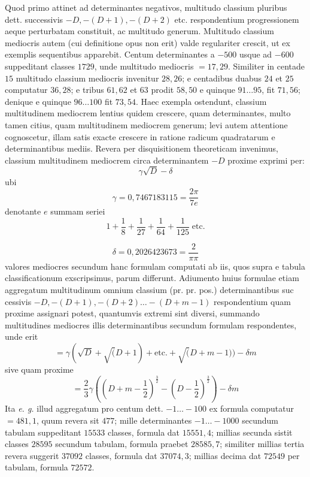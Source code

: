 Quod primo attinet ad determinantes negativos, multitudo classium pluribus dett. successivis \(-D,-(D+1),-(D+2)\) etc. respondentium progressionem aeque perturbatam constituit, ac multitudo generum. Multitudo classium mediocris autem (cui definitione opus non erit) valde regulariter crescit, ut ex exemplis sequentibus apparebit. Centum determinantes a \(-500\) usque ad \(-600\) suppeditant classes \(1729\), unde multitudo mediocris \(=17{,}29\). Similiter in centade \(15\) multitudo classium mediocris invenitur \(28{,}26\); e centadibus duabus \(24\) et \(25\) computatur \(36{,}28\); e tribus \(61,62\) et \(63\) prodit \(58{,}50\) e quinque \(91\ldots95\), fit \(71{,}56\); denique e quinque \(96\ldots100\) fit \(73{,}54\). Haec exempla ostendunt, classium multitudinem mediocrem lentius quidem crescere, quam determinantes, multo tamen citius, quam multitudinem mediocrem generum; levi autem attentione cognoscetur, illam satis exacte crescere in ratione radicum quadratarum e determinantibus mediis. Revera per disquisitionem theoreticam invenimus, classium multitudinem mediocrem circa determinantem \(-D\) proxime exprimi per: 
\[\gamma\surd D-\delta\]
 ubi 
\[\gamma=0{,}7467183115=\frac{2\pi}{7e}\]
 denotante \(e\) summam seriei 
\[1+\frac18+\frac1{27}+\frac1{64}+\frac1{125}\;\text{etc.}\]
 
\[\delta=0{,}2026423673=\frac2{\pi\pi}\]
 valores mediocres secundum hanc formulam computati ab iis, quos supra e tabula classificationum exscripsimus, parum differunt. Adiumento huius formulae etiam aggregatum multitudinum omnium classium (pr. pr. pos.) determinantibus suc%
cessivis \(-D,-(D+1),-(D+2)\ldots-(D+m-1)\) respondentium quam proxime assignari potest, quantumvis extremi sint diversi, summando multitudines mediocres illis determinantibus secundum formulam respondentes, unde erit 
\[=\gamma(\surd D+\surd(D+1)+\text{etc.}+\surd(D+m-1))-\delta m\]
 sive quam proxime 
\[=\frac23\gamma((D+m-\frac12)^{\frac32}-(D-\frac12)^{\frac32})-\delta m\]
 Ita \textit{e. g.} illud aggregatum pro centum dett. \(-1\ldots-100\) ex formula computatur \(=481{,}1\), quum revera sit \(477\); mille determinantes \(-1\ldots-1000\) secundum tabulam suppeditant \(15533\) classes, formula dat \(15551{,}4\); millias secunda sistit classes \(28595\) secundum tabulam, formula praebet \(28585{,}7\); similiter millias tertia revera suggerit \(37092\) classes, formula dat \(37074{,}3\); millias decima dat \(72549\) per tabulam, formula \(72572\).

